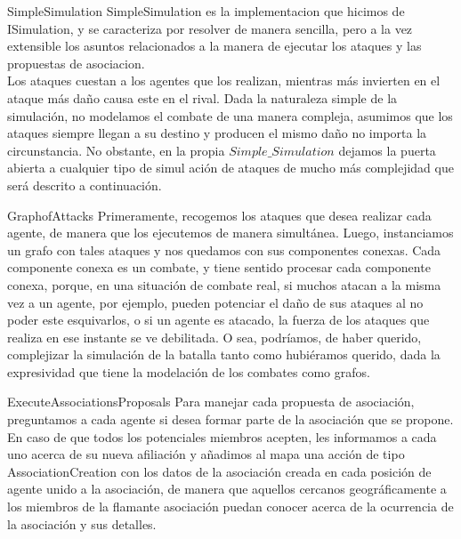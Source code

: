 \documentclass{beamer}
\begin{document}
\begin{frame}{SimpleSimulation}
  Simple\textunderscore Simulation es la implementacion que hicimos de ISimulation, y se caracteriza por resolver de manera sencilla, pero a la vez extensible los asuntos relacionados a la manera de ejecutar los ataques y las propuestas de asociacion.\\
  Los ataques cuestan a los agentes que los realizan, mientras más invierten en el ataque más daño causa este en el rival. Dada la naturaleza simple de la simulación, no modelamos el combate de una manera compleja, asumimos que los ataques siempre llegan a su destino y producen el mismo daño no importa la circunstancia. No obstante, en la propia $Simple\_Simulation$ dejamos la puerta abierta a cualquier tipo de simul
  ación de ataques de mucho más complejidad que será descrito a continuación.
\end{frame}

\begin{frame}{Graph\textunderscore of\textunderscore Attacks}
  Primeramente, recogemos los ataques que desea realizar cada agente, de manera que los ejecutemos de manera simultánea. Luego, instanciamos un grafo con tales ataques y nos quedamos con sus componentes conexas. Cada componente conexa es un combate, y tiene sentido procesar cada componente conexa, porque, en una situación de combate real, si muchos atacan a la misma vez a un agente, por ejemplo, pueden potenciar el daño de sus ataques al no poder este esquivarlos, o si un agente es atacado, la fuerza de los ataques que realiza en ese instante se ve debilitada. O sea, podríamos, de haber querido, complejizar la simulación de la batalla tanto como hubiéramos querido, dada la expresividad que tiene la modelación de los combates como grafos.
\end{frame}

\begin{frame}{Execute\textunderscore Associations\textunderscore Proposals}
  Para manejar cada propuesta de asociación, preguntamos a cada agente si desea formar parte de la asociación que se propone. En caso de que todos los potenciales miembros acepten, les informamos a cada uno acerca de su nueva afiliación y añadimos al mapa una acción de tipo Association\textunderscore Creation con los datos de la asociación creada en cada posición de agente unido a la asociación, de manera que aquellos cercanos geográficamente a los miembros de la flamante asociación puedan conocer acerca de la ocurrencia de la asociación y sus detalles.
\end{frame}
\end{document}
